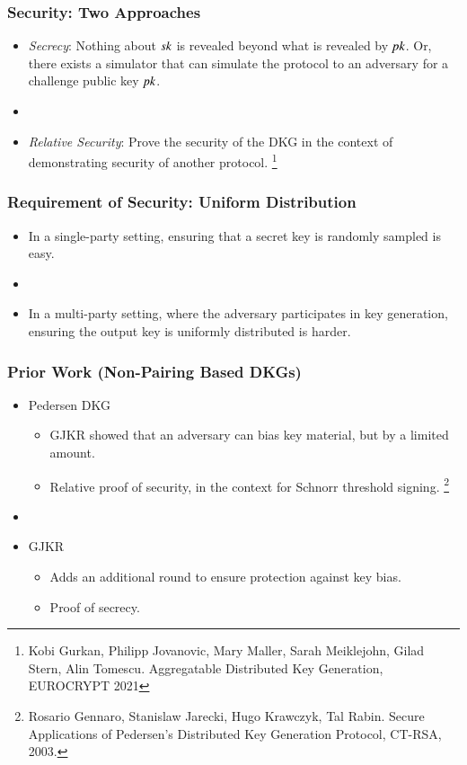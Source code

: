 \documentclass[hyperref={pdfpagelabels=true},table,dvipsnames,14pt,aspectratio=169]{beamer}
\begin{document}
\begin{frame}
  \frametitle{Security: Two Approaches}

  \begin{itemize}
    \item<1-> \emph{Secrecy}: Nothing about $\mathit{sk}$ is revealed beyond what is revealed by $\mathit{pk}$.
      Or, there exists a simulator that can simulate the protocol to an adversary for a challenge public key $\mathit{pk}$.
    \item[]
    \item<2-> \emph{Relative Security}: Prove the security of the DKG in the context of demonstrating security of another protocol.
  \footnote{
  Kobi Gurkan, Philipp Jovanovic, Mary Maller, Sarah Meiklejohn, Gilad Stern, Alin Tomescu.
  Aggregatable Distributed Key Generation, EUROCRYPT 2021 }
  \end{itemize}
\end{frame}

\begin{frame}
  \frametitle{Requirement of Security: Uniform Distribution}

  \begin{itemize}
    \item<1-> In a single-party setting, ensuring that a secret key is randomly sampled is easy.
    \item[]
    \item<2-> In a multi-party setting, where the adversary participates in key generation,
      ensuring the output key is uniformly distributed is harder.
  \end{itemize}
\end{frame}


\begin{frame}
  \frametitle{Prior Work (Non-Pairing Based DKGs)}

  \begin{itemize}
    \item<1-> Pedersen DKG
  \begin{itemize}
      \item<2-> GJKR showed that an adversary can bias key material, but by a limited amount.
      \item<3-> Relative proof of security, in the context for Schnorr threshold signing.
  \footnote{
  Rosario Gennaro, Stanislaw Jarecki, Hugo Krawczyk, Tal Rabin.
  Secure Applications of Pedersen's Distributed Key Generation Protocol,
  CT-RSA, 2003.}
  \end{itemize}
    \item[]
    \item<4-> GJKR
  \begin{itemize}
      \item<5-> Adds an additional round to ensure protection against key bias.
      \item<6-> Proof of secrecy.
  \end{itemize}
  \end{itemize}
\end{frame}
\end{document}
